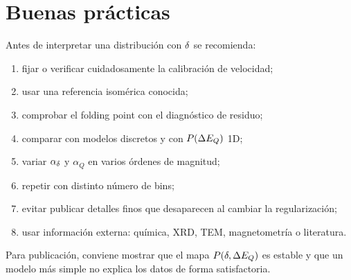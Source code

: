 \section{Buenas prácticas}

Antes de interpretar una distribución con $\delta$ se recomienda:
\begin{enumerate}
  \item fijar o verificar cuidadosamente la calibración de velocidad;
  \item usar una referencia isomérica conocida;
  \item comprobar el folding point con el diagnóstico de residuo;
  \item comparar con modelos discretos y con $P(\Delta E_Q)$ 1D;
  \item variar $\alpha_{\delta}$ y $\alpha_Q$ en varios órdenes de magnitud;
  \item repetir con distinto número de bins;
  \item evitar publicar detalles finos que desaparecen al cambiar la
  regularización;
  \item usar información externa: química, XRD, TEM, magnetometría o literatura.
\end{enumerate}
Para publicación, conviene mostrar que el mapa $P(\delta,\Delta E_Q)$ es estable y que un
modelo más simple no explica los datos de forma satisfactoria.
